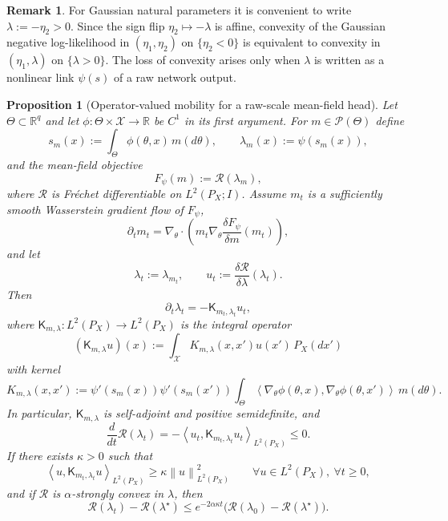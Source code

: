 \documentclass[11pt]{article}
\newtheorem{proposition}[theorem]{Proposition}
\theoremstyle{definition}
\newtheorem{remark}[theorem]{Remark}
\newcommand{\R}{\mathbb{R}}
\newcommand{\ip}[2]{\left\langle #1, #2 \right\rangle}
\newcommand{\norm}[1]{\left\lVert #1 \right\rVert}
\newcommand{\mc}[1]{\mathcal{#1}}
\begin{document}
\begin{remark}
For Gaussian natural parameters it is convenient to write
$\lambda:=-\eta_2>0$. Since the sign flip $\eta_2\mapsto -\lambda$ is affine,
convexity of the Gaussian negative log-likelihood in $(\eta_1,\eta_2)$ on
$\{\eta_2<0\}$ is equivalent to convexity in $(\eta_1,\lambda)$ on
$\{\lambda>0\}$. The loss of convexity arises only when $\lambda$ is written as
a nonlinear link $\psi(s)$ of a raw network output.
\end{remark}

\begin{proposition}[Operator-valued mobility for a raw-scale mean-field head]
\label{prop:operator-mobility}
Let $\Theta\subset \R^q$ and let $\phi:\Theta\times \mc{X}\to \R$ be $C^1$ in
its first argument. For $m\in \mc{P}(\Theta)$ define
\[
  s_m(x) := \int_\Theta \phi(\theta,x)\,m(d\theta),
  \qquad
  \lambda_m(x) := \psi(s_m(x)),
\]
and the mean-field objective
\[
  F_\psi(m) := \mc{R}(\lambda_m),
\]
where $\mc{R}$ is Fr\'echet differentiable on $L^2(P_X;I)$. Assume $m_t$ is a
sufficiently smooth Wasserstein gradient flow of $F_\psi$,
\begin{equation}
  \partial_t m_t
  =
  \nabla_\theta \cdot
  \left(
    m_t \nabla_\theta \frac{\delta F_\psi}{\delta m}(m_t)
  \right),
  \label{eq:reparam-wgf}
\end{equation}
and let
\[
  \lambda_t:=\lambda_{m_t},
  \qquad
  u_t:=\frac{\delta \mc{R}}{\delta \lambda}(\lambda_t).
\]
Then
\begin{equation}
  \partial_t \lambda_t
  =
  -\mathsf{K}_{m_t,\lambda_t}u_t,
  \label{eq:operator-mobility-flow}
\end{equation}
where $\mathsf{K}_{m,\lambda}:L^2(P_X)\to L^2(P_X)$ is the integral operator
\[
  (\mathsf{K}_{m,\lambda}u)(x)
  :=
  \int_{\mc{X}} K_{m,\lambda}(x,x')u(x')\,P_X(dx')
\]
with kernel
\begin{equation}
  K_{m,\lambda}(x,x')
  :=
  \psi'(s_m(x))\psi'(s_m(x'))
  \int_\Theta
  \ip{\nabla_\theta \phi(\theta,x)}{\nabla_\theta \phi(\theta,x')}
  \,m(d\theta).
  \label{eq:operator-mobility-kernel}
\end{equation}
In particular, $\mathsf{K}_{m,\lambda}$ is self-adjoint and positive
semidefinite, and
\begin{equation}
  \frac{d}{dt}\mc{R}(\lambda_t)
  =
  -
  \ip{u_t}{\mathsf{K}_{m_t,\lambda_t}u_t}_{L^2(P_X)}
  \le 0.
  \label{eq:operator-dissipation}
\end{equation}
If there exists $\kappa>0$ such that
\begin{equation}
  \ip{u}{\mathsf{K}_{m_t,\lambda_t}u}_{L^2(P_X)}
  \ge
  \kappa \norm{u}_{L^2(P_X)}^2
  \qquad
  \forall u \in L^2(P_X),\ \forall t\ge 0,
  \label{eq:operator-coercive}
\end{equation}
and if $\mc{R}$ is $\alpha$-strongly convex in $\lambda$, then
\begin{equation}
  \mc{R}(\lambda_t)-\mc{R}(\lambda^\star)
  \le
  e^{-2\alpha \kappa t}
  \big(\mc{R}(\lambda_0)-\mc{R}(\lambda^\star)\big).
  \label{eq:operator-exp-rate}
\end{equation}
\end{proposition}
\end{document}
